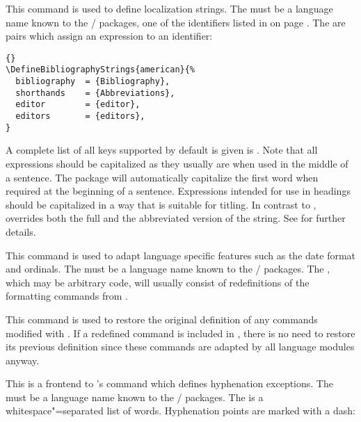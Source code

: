 \begin{ltxsyntax}


This command is used to define localization strings. The  must be a language name known to the / packages, \ie one of the identifiers listed in  on page \pageref{bib:fld:tab1}. The  are \keyval pairs which assign an expression to an identifier:

\begin{lstlisting}[style=latex]{}
\DefineBibliographyStrings{american}{%
  bibliography  = {Bibliography},
  shorthands    = {Abbreviations},
  editor        = {editor},
  editors       = {editors},
}
\end{lstlisting}
%
A complete list of all keys supported by default is given is . Note that all expressions should be capitalized as they usually are when used in the middle of a sentence. The \biblatex package will automatically capitalize the first word when required at the beginning of a sentence. Expressions intended for use in headings should be capitalized in a way that is suitable for titling. In contrast to ,  overrides both the full and the abbreviated version of the string. See  for further details.


This command is used to adapt language specific features such as the date format and ordinals. The  must be a language name known to the / packages. The , which may be arbitrary \latex code, will usually consist of redefinitions of the formatting commands from .


This command is used to restore the original definition of any commands modified with . If a redefined command is included in , there is no need to restore its previous definition since these commands are adapted by all language modules anyway.


This is a \latex frontend to \tex's  command which defines hyphenation exceptions.
The  must be a language name known to the / packages. The  is a whitespace"=separated list of words. Hyphenation points are marked with a dash:


\end{ltxsyntax}
